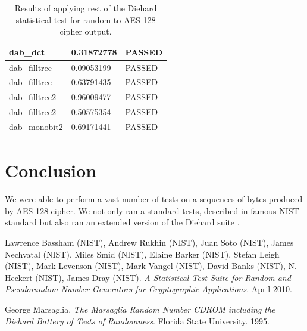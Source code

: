 \documentclass[conference]{IEEEtran}
\begin{document}
\begin{center}
\begin{table}
\begin{tabular}{|l|l|l|}
dab\_dct                               & 0.31872778 & PASSED \\ \hline
dab\_filltree                          & 0.09053199 & PASSED \\ \hline
dab\_filltree                          & 0.63791435 & PASSED \\ \hline
dab\_filltree2                         & 0.96009477 & PASSED \\ \hline
dab\_filltree2                         & 0.50575354 & PASSED \\ \hline
dab\_monobit2                          & 0.69171441 & PASSED \\ \hline
\end{tabular}
\caption{Results of applying rest of the Diehard statistical test for random to AES-128 cipher output.}
\label{dieharderesults3}
\end{table}
\end{center}

\section{Conclusion}
We were able to perform a vast number of tests on a sequences of bytes produced by AES-128 cipher. We not only ran a standard tests, described in famous NIST standard \cite{nisttests} but also ran an extended version of the Diehard suite \cite{diehardtests}. 
 

\begin{thebibliography}{9}

Lawrence Bassham (NIST), Andrew Rukhin (NIST), Juan Soto (NIST), James Nechvatal (NIST), Miles Smid (NIST), Elaine Barker (NIST), Stefan Leigh (NIST), Mark Levenson (NIST), Mark Vangel (NIST), David Banks (NIST), N. Heckert (NIST), James Dray (NIST). 
\textit{A Statistical Test Suite for Random and Pseudorandom Number Generators for Cryptographic Applications}. 
April 2010.

George Marsaglia. 
\textit{The Marsaglia Random Number CDROM including the Diehard Battery of Tests of Randomness}. 
Florida State University. 1995.

\end{thebibliography}
\end{document}
